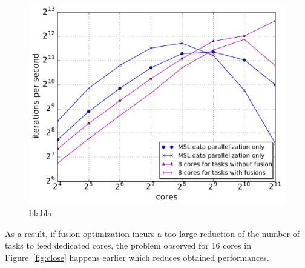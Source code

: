 \begin{figure}[!h]\begin{center}
  \includegraphics[width=.6\textwidth]{../results/task_scaling/500_200/withwithout8_close_median.pdf}
  \caption{blabla}
  \label{fig:fusion2}
\end{center}\end{figure}

As a result, if fusion optimization incurs a too large reduction of the number of tasks to feed dedicated cores, the problem observed for 16 cores in Figure~\ref{fig:close} happens earlier which reduces obtained performances.
